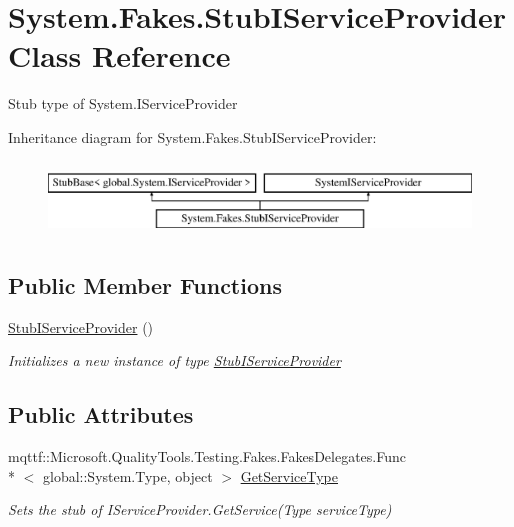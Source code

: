 \hypertarget{class_system_1_1_fakes_1_1_stub_i_service_provider}{\section{System.\-Fakes.\-Stub\-I\-Service\-Provider Class Reference}
\label{class_system_1_1_fakes_1_1_stub_i_service_provider}
}


Stub type of System.\-I\-Service\-Provider 


Inheritance diagram for System.\-Fakes.\-Stub\-I\-Service\-Provider\-:\begin{figure}[H]
\begin{center}
\leavevmode
\includegraphics[height=2.000000cm]{class_system_1_1_fakes_1_1_stub_i_service_provider}
\end{center}
\end{figure}
\subsection*{Public Member Functions}
\begin{DoxyCompactItemize}
\item 
\hyperlink{class_system_1_1_fakes_1_1_stub_i_service_provider_af64ccc9356f2e6294d70aa48f2290c8a}{Stub\-I\-Service\-Provider} ()
\begin{DoxyCompactList}\small\item\em Initializes a new instance of type \hyperlink{class_system_1_1_fakes_1_1_stub_i_service_provider}{Stub\-I\-Service\-Provider}\end{DoxyCompactList}\end{DoxyCompactItemize}
\subsection*{Public Attributes}
\begin{DoxyCompactItemize}
\item 
mqttf\-::\-Microsoft.\-Quality\-Tools.\-Testing.\-Fakes.\-Fakes\-Delegates.\-Func\\*
$<$ global\-::\-System.\-Type, object $>$ \hyperlink{class_system_1_1_fakes_1_1_stub_i_service_provider_ab355c34171311d01a67b4f421ca821e0}{Get\-Service\-Type}
\begin{DoxyCompactList}\small\item\em Sets the stub of I\-Service\-Provider.\-Get\-Service(\-Type service\-Type)\end{DoxyCompactList}\end{DoxyCompactItemize}


